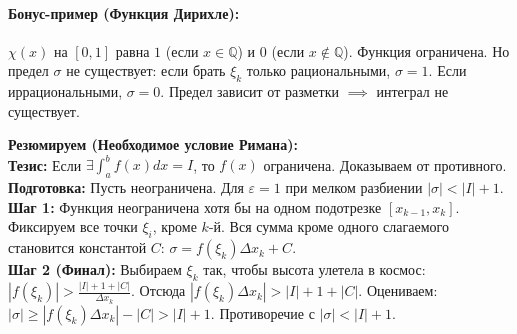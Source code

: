 \paragraph{Бонус-пример (Функция Дирихле):}
$\chi(x)$ на $[0, 1]$ равна $1$ (если $x \in \mathbb{Q}$) и $0$ (если $x \notin \mathbb{Q}$). Функция ограничена. Но предел $\sigma$ не существует: если брать $\xi_k$ только рациональными, $\sigma = 1$. Если иррациональными, $\sigma = 0$. Предел зависит от разметки $\implies$ интеграл не существует.

\begin{tcolorbox}[colback=gray!5, colframe=black, boxrule=0.5pt, arc=0pt]
\textbf{Резюмируем (Необходимое условие Римана):} \\
\textbf{Тезис:} Если $\exists \int_a^b f(x)dx = I$, то $f(x)$ ограничена. Доказываем от противного. \\
\textbf{Подготовка:} Пусть неограничена. Для $\varepsilon=1$ при мелком разбиении $|\sigma| < |I|+1$. \\
\textbf{Шаг 1:} Функция неограничена хотя бы на одном подотрезке $[x_{k-1}, x_k]$. Фиксируем все точки $\xi_i$, кроме $k$-й. Вся сумма кроме одного слагаемого становится константой $C$: $\sigma = f(\xi_k)\Delta x_k + C$. \\
\textbf{Шаг 2 (Финал):} Выбираем $\xi_k$ так, чтобы высота улетела в космос: $|f(\xi_k)| > \frac{|I|+1+|C|}{\Delta x_k}$. Отсюда $|f(\xi_k)\Delta x_k| > |I|+1+|C|$. Оцениваем: $|\sigma| \ge |f(\xi_k)\Delta x_k| - |C| > |I|+1$. Противоречие с $|\sigma| < |I|+1$.
\end{tcolorbox}